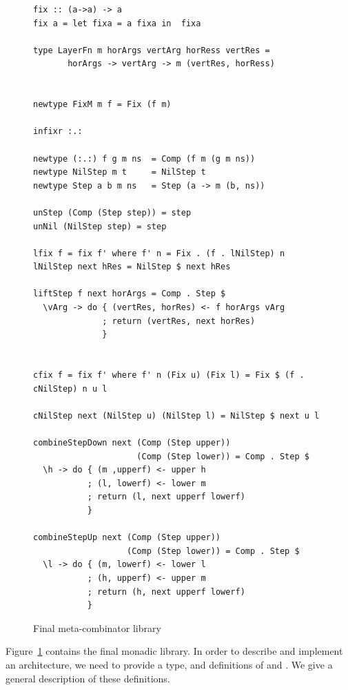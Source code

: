 \documentclass{llncs}
\begin{document}
\begin{figure}
\begin{small}
\begin{center}
\begin{footnotesize}
\begin{verbatim}
fix :: (a->a) -> a
fix a = let fixa = a fixa in  fixa

type LayerFn m horArgs vertArg horRess vertRes =
       horArgs -> vertArg -> m (vertRes, horRess)


newtype FixM m f = Fix (f m)

infixr :.:

newtype (:.:) f g m ns  = Comp (f m (g m ns))
newtype NilStep m t     = NilStep t
newtype Step a b m ns   = Step (a -> m (b, ns))

unStep (Comp (Step step)) = step
unNil (NilStep step) = step

lfix f = fix f' where f' n = Fix . (f . lNilStep) n
lNilStep next hRes = NilStep $ next hRes

liftStep f next horArgs = Comp . Step $ 
  \vArg -> do { (vertRes, horRes) <- f horArgs vArg
              ; return (vertRes, next horRes)
              }
              

cfix f = fix f' where f' n (Fix u) (Fix l) = Fix $ (f . cNilStep) n u l

cNilStep next (NilStep u) (NilStep l) = NilStep $ next u l

combineStepDown next (Comp (Step upper)) 
                     (Comp (Step lower)) = Comp . Step $
  \h -> do { (m ,upperf) <- upper h
           ; (l, lowerf) <- lower m
           ; return (l, next upperf lowerf)   
           }

combineStepUp next (Comp (Step upper)) 
                   (Comp (Step lower)) = Comp . Step $
  \l -> do { (m, lowerf) <- lower l
           ; (h, upperf) <- upper m
           ; return (h, next upperf lowerf)
           }
\end{verbatim} %
\end{footnotesize}\caption{Final meta-combinator library}\label{fig:metacombinators} 
\end{center}
\end{small}
\end{figure}

Figure~\ref{fig:metacombinators} contains the final monadic library. In order to describe and implement an architecture, we need to provide a  type, and definitions of  and . We give a general description of these definitions.
\end{document}
